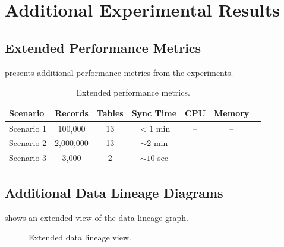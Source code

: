 
\chapter{Additional Experimental Results}
\label{app:results}


\section{Extended Performance Metrics}
\label{app:extended_metrics}

 presents additional performance metrics from the experiments.

\begin{table}[tbp]
\centering
\caption{Extended performance metrics.}
\label{tab:extended_metrics}
\begin{tabular}{@{}lcccccc@{}}
\toprule
\textbf{Scenario} & \textbf{Records} & \textbf{Tables} & \textbf{Sync Time} & \textbf{CPU} & \textbf{Memory} \\
\midrule
Scenario 1 & 100,000 & 13 & $<1$ min & -- & -- \\
Scenario 2 & 2,000,000 & 13 & $\sim2$ min & -- & -- \\
Scenario 3 & 3,000 & 2 & $\sim10$ sec & -- & -- \\
\bottomrule
\end{tabular}
\end{table}

\section{Additional Data Lineage Diagrams}
\label{app:lineage_extra}

 shows an extended view of the data lineage graph.

\begin{figure}[tbp]
\centering
{}
\caption{Extended data lineage view.}
\label{fig:lineage_extra}
\end{figure}
